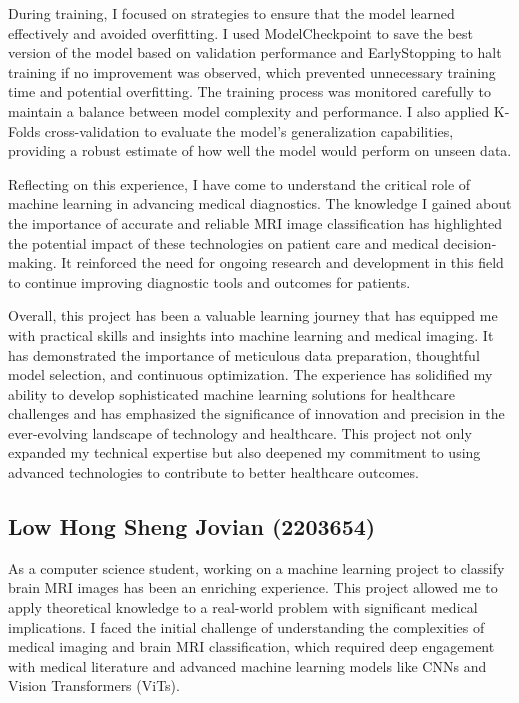 During training, I focused on strategies to ensure that the model learned effectively and avoided overfitting. I used ModelCheckpoint to save the best version of the model based on validation performance and EarlyStopping to halt training if no improvement was observed, which prevented unnecessary training time and potential overfitting. The training process was monitored carefully to maintain a balance between model complexity and performance. I also applied K-Folds cross-validation to evaluate the model's generalization capabilities, providing a robust estimate of how well the model would perform on unseen data.

Reflecting on this experience, I have come to understand the critical role of machine learning in advancing medical diagnostics. The knowledge I gained about the importance of accurate and reliable MRI image classification has highlighted the potential impact of these technologies on patient care and medical decision-making. It reinforced the need for ongoing research and development in this field to continue improving diagnostic tools and outcomes for patients.

Overall, this project has been a valuable learning journey that has equipped me with practical skills and insights into machine learning and medical imaging. It has demonstrated the importance of meticulous data preparation, thoughtful model selection, and continuous optimization. The experience has solidified my ability to develop sophisticated machine learning solutions for healthcare challenges and has emphasized the significance of innovation and precision in the ever-evolving landscape of technology and healthcare. This project not only expanded my technical expertise but also deepened my commitment to using advanced technologies to contribute to better healthcare outcomes.


\subsection{Low Hong Sheng Jovian (2203654)}\label{ss:lhsj}

As a computer science student, working on a machine learning project to classify brain MRI images has been an enriching experience. This project allowed me to apply theoretical knowledge to a real-world problem with significant medical implications. I faced the initial challenge of understanding the complexities of medical imaging and brain MRI classification, which required deep engagement with medical literature and advanced machine learning models like CNNs and Vision Transformers (ViTs).

